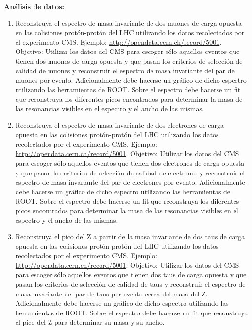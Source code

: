 \documentclass[10.5pt]{article}
\begin{document}
{\bf Análisis de datos:}
\begin{enumerate}
\item Reconstruya el espectro de masa invariante de dos muones de carga opuesta en las colisiones protón-protón del LHC utilizando los datos recolectados por el experimento CMS. Ejemplo: \url{http://opendata.cern.ch/record/5001}. Objetivo: Utilizar los datos del CMS para escoger sólo aquellos eventos que tienen dos muones de carga opuesta y que pasan los criterios de selección de calidad de muones y reconstruir el espectro de masa invariante del par de muones por evento. Adicionalmente debe hacerse un gráfico de dicho espectro utilizando las herramientas de ROOT. Sobre el espectro debe hacerse un fit que reconstruya los diferentes picos encontrados para determinar la masa de las resonancias visibles en el espectro y el ancho de las mismas.
\item Reconstruya el espectro de masa invariante de dos electrones de carga opuesta en las colisiones protón-protón del LHC utilizando los datos recolectados por el experimento CMS. Ejemplo: \url{http://opendata.cern.ch/record/5001}. Objetivo: Utilizar los datos del CMS para escoger sólo aquellos eventos que tienen dos electrones de carga opuesta y que pasan los criterios de selección de calidad de electrones y reconstruir el espectro de masa invariante del par de electrones por evento. Adicionalmente debe hacerse un gráfico de dicho espectro utilizando las herramientas de ROOT. Sobre el espectro debe hacerse un fit que reconstruya los diferentes picos encontrados para determinar la masa de las resonancias visibles en el espectro y el ancho de las mismas.
\item Reconstruya el pico del Z a partir de la masa invariante de dos taus de carga opuesta en las colisiones protón-protón del LHC utilizando los datos recolectados por el experimento CMS. Ejemplo: \url{http://opendata.cern.ch/record/5001}. Objetivo: Utilizar los datos del CMS para escoger sólo aquellos eventos que tienen dos taus de carga opuesta y que pasan los criterios de selección de calidad de taus y reconstruir el espectro de masa invariante del par de taus por evento cerca del masa del Z. Adicionalmente debe hacerse un gráfico de dicho espectro utilizando las herramientas de ROOT. Sobre el espectro debe hacerse un fit que reconstruya el pico del Z para determinar su masa y su ancho.
\end{enumerate}
\end{document}
